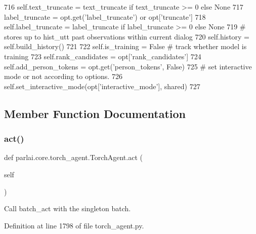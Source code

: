 \begin{DoxyCode}
716         self.text\_truncate = text\_truncate \textcolor{keywordflow}{if} text\_truncate >= 0 \textcolor{keywordflow}{else} \textcolor{keywordtype}{None}
717         label\_truncate = opt.get(\textcolor{stringliteral}{'label\_truncate'}) \textcolor{keywordflow}{or} opt[\textcolor{stringliteral}{'truncate'}]
718         self.label\_truncate = label\_truncate \textcolor{keywordflow}{if} label\_truncate >= 0 \textcolor{keywordflow}{else} \textcolor{keywordtype}{None}
719         \textcolor{comment}{# stores up to hist\_utt past observations within current dialog}
720         self.history = self.build\_history()
721 
722         self.is\_training = \textcolor{keyword}{False}  \textcolor{comment}{# track whether model is training}
723         self.rank\_candidates = opt[\textcolor{stringliteral}{'rank\_candidates'}]
724         self.add\_person\_tokens = opt.get(\textcolor{stringliteral}{'person\_tokens'}, \textcolor{keyword}{False})
725         \textcolor{comment}{# set interactive mode or not according to options.}
726         self.set\_interactive\_mode(opt[\textcolor{stringliteral}{'interactive\_mode'}], shared)
727 
\end{DoxyCode}


\subsection{Member Function Documentation}
\mbox{\label{classparlai_1_1core_1_1torch__agent_1_1TorchAgent_a51174dfa508970e3392246b02d0d94b5}} 
\subsubsection{\texorpdfstring{act()}{act()}}
{\footnotesize\ttfamily def parlai.\+core.\+torch\+\_\+agent.\+Torch\+Agent.\+act (\begin{DoxyParamCaption}\item[{}]{self }\end{DoxyParamCaption})}

\begin{DoxyVerb}Call batch_act with the singleton batch.
\end{DoxyVerb}
 

Definition at line 1798 of file torch\+\_\+agent.\+py.


